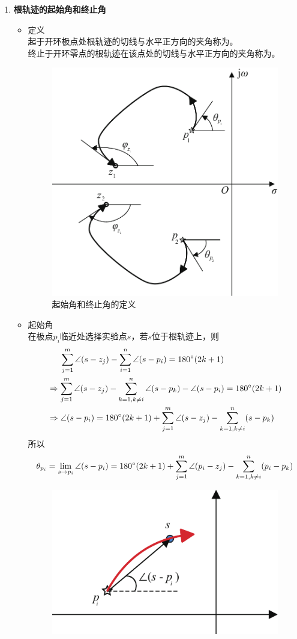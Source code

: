 \begin{enumerate}
	\item \textbf{根轨迹的起始角和终止角}
	\begin{itemize}
		\item 定义\\
		起于开环极点处根轨迹的切线与水平正方向的夹角称为。\\
		终止于开环零点的根轨迹在该点处的切线与水平正方向的夹角称为。
		\begin{figure}[!htb]
			\centering
			\includegraphics[width=0.4\linewidth]{pic/起始角和终止角.pdf}
			\caption{起始角和终止角的定义}
		\end{figure}
		\item 起始角\\
		在极点$p_i$临近处选择实验点$s$，若$s$位于根轨迹上，则
		\begin{align*}
			& \quad \,\,\, \sum_{j = 1}^{m}\angle (s - z_j) - \sum_{i = 1}^{n} \angle(s - p_i) = 180 {}^{\circ} (2k + 1)\\
			&\Rightarrow 	\sum_{j = 1}^{m}\angle (s - z_j) - \sum_{k = 1, k \neq i }^{n} \angle(s - p_k)  - \angle (s - p_i) = 180 {}^{\circ} (2k + 1) \\
			&\Rightarrow \angle (s - p_i) = 180 {}^{\circ} (2k + 1) + \sum_{j = 1}^{m}\angle (s - z_j) - \sum_{k = 1, k \neq i }^{n} (s - p_k) 
		\end{align*}
		所以
	\begin{align}
		\theta_{p_i} = \lim\limits_{s \to p_i} \angle (s - p_i) =  180 {}^{\circ} (2k + 1) + \sum_{j = 1}^{m}\angle (p_i - z_j) - \sum_{k = 1, k \neq i }^{n} (p_i - p_k) 
	\end{align}
	\vspace*{-1em}
	\begin{figure}[!htb]
		\begin{center}
			\begin{minipage}{0.45\linewidth}
				\centering
				\includegraphics[width=0.9\linewidth]{pic/起始点.pdf}

\end{minipage}
\end{center}
\end{figure}
\end{itemize}
\end{enumerate}
